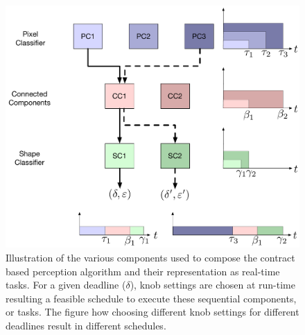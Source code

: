 \begin{figure}[htbp]
  \centering
  \includegraphics[width=0.9\columnwidth]{figures/omnigraffle_figures/real_time_figure}
  \caption{Illustration of the various components used to compose the contract based perception algorithm and their representation as real-time tasks. For a given deadline ($\delta$), knob settings are chosen at run-time resulting a feasible schedule to execute these sequential components, or tasks. The figure how choosing different knob settings for different deadlines result in different schedules.}
\end{figure}








%

